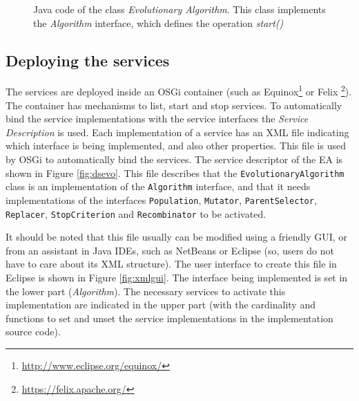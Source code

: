 \begin{figure}
\usebox{\mintedbox}
\caption{Java code of the class {\em Evolutionary Algorithm}. This class implements the {\em Algorithm} interface, which defines the operation {\em start()} } 
\label{fig:javaevo} 
\end{figure}



\subsection{Deploying the services}

The services are deployed inside an OSGi container (such as Equinox\footnote{\url{http://www.eclipse.org/equinox/}} or Felix \footnote{\url{https://felix.apache.org/}}). The container has mechanisms to list, start and stop services. To automatically bind the service implementations with the service interfaces                                
 the {\em Service Description} is used. %
Each implementation of a service has an XML file indicating which interface is being implemented, and also other properties. This file is used by OSGi to automatically bind the services. The service descriptor of the EA is shown in Figure \ref{fig:dsevo}. This file describes that the \texttt{EvolutionaryAlgorithm} class is an implementation of the \texttt{Algorithm} interface, and that it needs implementations of the interfaces \texttt{Population}, \texttt{Mutator}, \texttt{ParentSelector}, \texttt{Replacer}, \texttt{StopCriterion} and \texttt{Recombinator} to be activated. 

It should be noted that this file usually can be modified using a friendly GUI, or from an assistant in Java IDEs, such as NetBeans or Eclipse (so, users do not have to care about its XML structure). The user interface to create this file in Eclipse is shown in Figure \ref{fig:xmlgui}. The interface being implemented is set in the lower part ({\em Algorithm}). The necessary services to activate this implementation are indicated in the upper part (with the cardinality and functions to set and unset the service implementations in the implementation source code).

